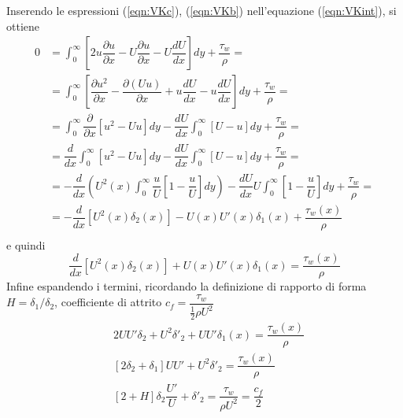Inserendo le espressioni (\ref{eqn:VKc}), (\ref{eqn:VKb}) nell'equazione (\ref{eqn:VKint}), si ottiene
 \begin{equation}
  \begin{aligned} 
  0 & = \int_{0}^{\infty} \left[ 2 u \dfrac{\partial u}{\partial x} -  U \dfrac{\partial u}{\partial x} - U \dfrac{d U}{d x} \right] dy + \dfrac{\tau_w}{\rho} = \\
    & = \int_{0}^{\infty} \left[ \dfrac{\partial u^2}{\partial x}
        - \dfrac{\partial (U u)}{\partial x} + u \dfrac{d U}{d x} - u \dfrac{d U}{d x} \right] dy + \dfrac{\tau_w}{\rho} = \\
    & = \int_{0}^{\infty}  \dfrac{\partial}{\partial x} \left[ u^2 - U u \right] dy
    - \dfrac{dU}{dx} \int_{0}^{\infty} \left[ U - u \right]dy + \dfrac{\tau_w}{\rho} = \\
   & = \dfrac{d}{d x} \int_{0}^{\infty}   \left[ u^2 - U u \right] dy
    - \dfrac{dU}{dx} \int_{0}^{\infty} \left[ U - u \right]dy + \dfrac{\tau_w}{\rho} = \\
   & = - \dfrac{d}{d x} \left( U^2(x) \int_{0}^{\infty}  \dfrac{u}{U}  \left[ 1 -  \dfrac{u}{U} \right] dy \right)
    - \dfrac{dU}{dx} U \int_{0}^{\infty} \left[ 1 - \dfrac{u}{U} \right] dy + \dfrac{\tau_w}{\rho} = \\
   & = - \dfrac{d}{d x} \left[ U^2(x) \delta_2(x) \right] - U (x)U' (x)\delta_1(x)+ \dfrac{\tau_w(x)}{\rho} \\
  \end{aligned}
 \end{equation}
e quindi
 \begin{equation}
  \dfrac{d}{d x} \left[ U^2(x) \delta_2(x) \right] + U (x)U' (x)\delta_1(x) = \dfrac{\tau_w(x)}{\rho}
 \end{equation}
 Infine espandendo i termini, ricordando la definizione di rapporto di forma $H = \delta_1 / \delta_2$, coefficiente di attrito $c_f = \dfrac{\tau_w}{\frac{1}{2}\rho U^2}$
 \begin{equation}
 \begin{aligned}
  & 2 U U' \delta_2 + U^2 \delta'_2 + U U' \delta_1(x) = \dfrac{\tau_w(x)}{\rho} \\
  & [ 2 \delta_2 + \delta_1] U U' + U^2 \delta'_2 = \dfrac{\tau_w(x)}{\rho} \\
  & [ 2 + H ]\delta_2 \dfrac{U'}{U}  + \delta'_2 = \dfrac{\tau_w}{\rho U^2} = \dfrac{c_f}{2}
 \end{aligned}
 \end{equation}

